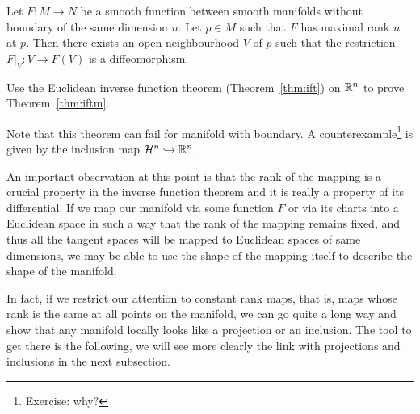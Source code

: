 \begin{theorem}\label{thm:iftm}
	Let $F:M\to N$ be a smooth function between smooth manifolds without boundary of the same dimension $n$.
	Let $p\in M$ such that $F$ has maximal rank $n$ at $p$.
	Then there exists an open neighbourhood $V$ of $p$ such that the restriction $F|_V : V\to F(V)$ is a diffeomorphism.
\end{theorem}
\begin{exercise}
	Use the Euclidean inverse function theorem (Theorem~\ref{thm:ift}) on $\mathbb{R}^n$ to prove Theorem~\ref{thm:iftm}.
\end{exercise}

Note that this theorem can fail for manifold with boundary.
A counterexample\footnote{Exercise: why?} is given by the inclusion map $\mathcal{H}^n \hookrightarrow \mathbb{R}^n$.

An important observation at this point is that the rank of the mapping
is a crucial property in the inverse function theorem and it is really a
property of its differential.
If we map our manifold via some function $F$ or via its charts into a
Euclidean space in such a way that the rank of the mapping remains fixed,
and thus all the tangent spaces will be mapped to Euclidean spaces of same dimensions,
we may be able to use the shape of the mapping itself to describe the
shape of the manifold.

In fact, if we restrict our attention to constant rank maps, that is,
maps whose rank is the same at all points on the manifold, we can go quite a
long way and show that any manifold locally looks like a projection or an inclusion.
The tool to get there is the following, we will see more clearly the link with
projections and inclusions in the next subsection.

